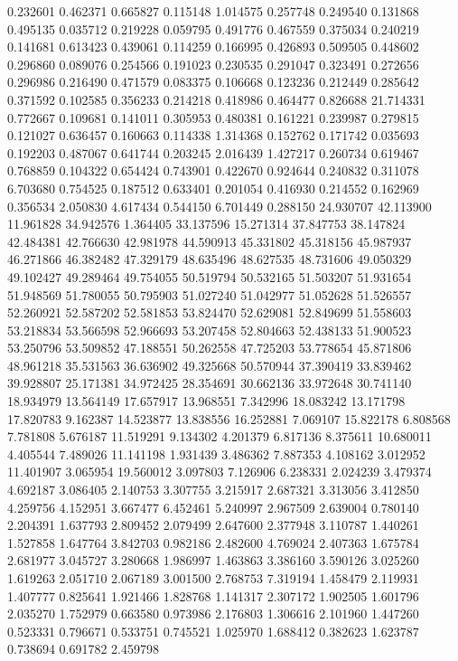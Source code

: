 0.232601
0.462371
0.665827
0.115148
1.014575
0.257748
0.249540
0.131868
0.495135
0.035712
0.219228
0.059795
0.491776
0.467559
0.375034
0.240219
0.141681
0.613423
0.439061
0.114259
0.166995
0.426893
0.509505
0.448602
0.296860
0.089076
0.254566
0.191023
0.230535
0.291047
0.323491
0.272656
0.296986
0.216490
0.471579
0.083375
0.106668
0.123236
0.212449
0.285642
0.371592
0.102585
0.356233
0.214218
0.418986
0.464477
0.826688
21.714331
0.772667
0.109681
0.141011
0.305953
0.480381
0.161221
0.239987
0.279815
0.121027
0.636457
0.160663
0.114338
1.314368
0.152762
0.171742
0.035693
0.192203
0.487067
0.641744
0.203245
2.016439
1.427217
0.260734
0.619467
0.768859
0.104322
0.654424
0.743901
0.422670
0.924644
0.240832
0.311078
6.703680
0.754525
0.187512
0.633401
0.201054
0.416930
0.214552
0.162969
0.356534
2.050830
4.617434
0.544150
6.701449
0.288150
24.930707
42.113900
11.961828
34.942576
1.364405
33.137596
15.271314
37.847753
38.147824
42.484381
42.766630
42.981978
44.590913
45.331802
45.318156
45.987937
46.271866
46.382482
47.329179
48.635496
48.627535
48.731606
49.050329
49.102427
49.289464
49.754055
50.519794
50.532165
51.503207
51.931654
51.948569
51.780055
50.795903
51.027240
51.042977
51.052628
51.526557
52.260921
52.587202
52.581853
53.824470
52.629081
52.849699
51.558603
53.218834
53.566598
52.966693
53.207458
52.804663
52.438133
51.900523
53.250796
53.509852
47.188551
50.262558
47.725203
53.778654
45.871806
48.961218
35.531563
36.636902
49.325668
50.570944
37.390419
33.839462
39.928807
25.171381
34.972425
28.354691
30.662136
33.972648
30.741140
18.934979
13.564149
17.657917
13.968551
7.342996
18.083242
13.171798
17.820783
9.162387
14.523877
13.838556
16.252881
7.069107
15.822178
6.808568
7.781808
5.676187
11.519291
9.134302
4.201379
6.817136
8.375611
10.680011
4.405544
7.489026
11.141198
1.931439
3.486362
7.887353
4.108162
3.012952
11.401907
3.065954
19.560012
3.097803
7.126906
6.238331
2.024239
3.479374
4.692187
3.086405
2.140753
3.307755
3.215917
2.687321
3.313056
3.412850
4.259756
4.152951
3.667477
6.452461
5.240997
2.967509
2.639004
0.780140
2.204391
1.637793
2.809452
2.079499
2.647600
2.377948
3.110787
1.440261
1.527858
1.647764
3.842703
0.982186
2.482600
4.769024
2.407363
1.675784
2.681977
3.045727
3.280668
1.986997
1.463863
3.386160
3.590126
3.025260
1.619263
2.051710
2.067189
3.001500
2.768753
7.319194
1.458479
2.119931
1.407777
0.825641
1.921466
1.828768
1.141317
2.307172
1.902505
1.601796
2.035270
1.752979
0.663580
0.973986
2.176803
1.306616
2.101960
1.447260
0.523331
0.796671
0.533751
0.745521
1.025970
1.688412
0.382623
1.623787
0.738694
0.691782
2.459798
